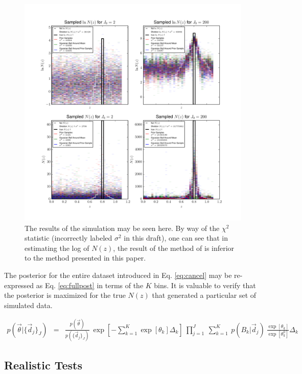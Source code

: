 \documentclass[preprint]{aastex}
\begin{document}
\begin{figure}
\includegraphics[width=\textwidth]{results.pdf}
\caption{The results of the simulation may be seen here.  By way of the $\chi^{2}$ statistic (incorrectly labeled $\sigma^{2}$ in this draft), one can see that in estimating the log of $N(z)$, the result of the method of \citet{she11} is inferior to the method presented in this paper.}
\label{fig:dumbestparam}
\end{figure}

The posterior for the entire dataset introduced in Eq. \ref{eq:cancel} may be re-expressed as Eq. \ref{eq:fullpost} in terms of the $K$ bins.  It is valuable to verify that the posterior is maximized for the true $N(z)$ that generated a particular set of simulated data.

\begin{eqnarray}
\label{eq:fullpost}
p(\vec{\theta}|\{\vec{d}_{j}\}_{J}) &=& \frac{p(\vec{\theta})}{p(\{\vec{d}_{j}\}_{J})}\ \exp\left[-\sum_{k=1}^{K}\exp[\theta_{k}]\Delta_{k}\right]\ \prod_{j=1}^{J}\ \sum_{k=1}^{K}\ p(B_{k}|\vec{d}_{j})\ \frac{\exp[\theta_{k}]}{\exp[\theta_{k}^{0}]}\Delta_{k}
\end{eqnarray}

\subsection{Realistic Tests}
\label{sec:real}
\end{document}
